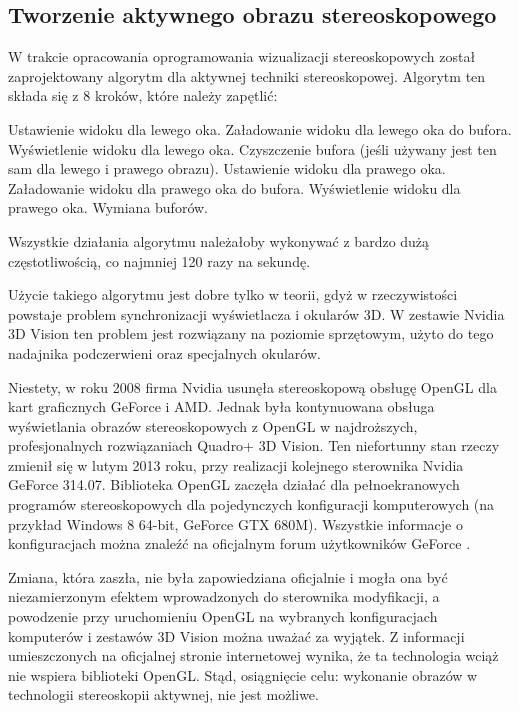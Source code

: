 \subsection{Tworzenie aktywnego obrazu stereoskopowego} 
W trakcie opracowania oprogramowania wizualizacji stereoskopowych został zaprojektowany algorytm dla aktywnej techniki stereoskopowej. Algorytm ten składa się z 8 kroków, które należy zapętlić:

\begin{itemize}
\itemi Ustawienie widoku dla lewego oka.
\itemi Załadowanie widoku dla lewego oka do bufora.
\itemi Wyświetlenie widoku dla lewego oka.
\itemi Czyszczenie bufora (jeśli używany jest ten sam dla lewego i prawego obrazu).
\itemi Ustawienie widoku dla prawego oka.
\itemi Załadowanie widoku dla prawego oka do bufora.
\itemi Wyświetlenie widoku dla prawego oka.
\itemi Wymiana buforów.
\end{itemize}

Wszystkie działania algorytmu należałoby wykonywać z bardzo dużą częstotliwością, co najmniej 120 razy na sekundę.

Użycie takiego algorytmu jest dobre tylko w teorii, gdyż w rzeczywistości powstaje problem synchronizacji wyświetlacza i okularów 3D. W zestawie Nvidia 3D Vision ten problem jest rozwiązany na poziomie sprzętowym, użyto do tego nadajnika podczerwieni oraz specjalnych okularów.

Niestety, w roku 2008 firma Nvidia usunęła stereoskopową obsługę OpenGL dla kart graficznych GeForce i AMD. Jednak była kontynuowana obsługa wyświetlania obrazów stereoskopowych z OpenGL w najdroższych, profesjonalnych rozwiązaniach Quadro+ 3D Vision. Ten niefortunny stan rzeczy zmienił się w lutym 2013 roku, przy realizacji kolejnego sterownika Nvidia GeForce 314.07. Biblioteka OpenGL zaczęła działać dla pełnoekranowych programów stereoskopowych dla pojedynczych konfiguracji komputerowych (na przykład Windows 8 64-bit, GeForce GTX 680M). Wszystkie informacje o konfiguracjach można znaleźć na oficjalnym forum użytkowników GeForce \cite{GeForceForum}.

Zmiana, która zaszła, nie była zapowiedziana oficjalnie i mogła ona być niezamierzonym efektem wprowadzonych do sterownika modyfikacji, a powodzenie przy uruchomieniu OpenGL na wybranych konfiguracjach komputerów i zestawów 3D Vision można uważać za wyjątek. Z informacji umieszczonych na oficjalnej stronie internetowej \cite{NvidiaInfo} wynika, że ta technologia wciąż nie wspiera biblioteki OpenGL. Stąd, osiągnięcie celu: wykonanie obrazów w technologii stereoskopii aktywnej, nie jest możliwe.


